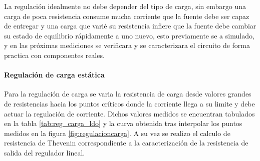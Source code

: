 \documentclass[]{article}
\begin{document}
	La regulación idealmente no debe depender del tipo de carga, sin embargo una carga de poca resistencia consume mucha corriente que la fuente debe ser capaz de entregar y una carga que varié su resistencia infiere que la fuente debe cambiar su estado de equilibrio rápidamente a uno nuevo, esto previamente se a simulado, y en las próximas mediciones se verificara y se caracterizara el circuito de forma practica con componentes reales.
	
	\paragraph{Regulación de carga estática }\hfill\break
	
	Para la regulación de carga se varia la resistencia de carga desde valores grandes de resistencias hacia los puntos críticos donde la corriente llega a su limite y debe actuar la regulación de corriente. Dichos valores medidos se encuentran tabulados en la tabla \ref{tab:reg_carga_ldo} y la curva obtenida tras interpolar los puntos medidos en la figura \ref{fig:regulacioncarga}. A su vez se realizo el calculo de resistencia de Thevenin correspondiente a la caracterización de la resistencia de salida del regulador lineal.
	
\end{document}

